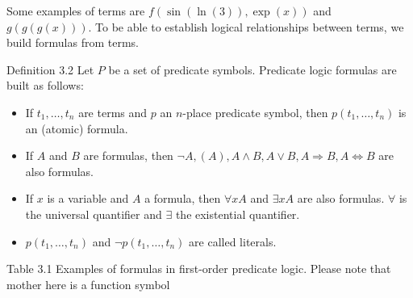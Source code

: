 \documentclass[10pt]{article}
\begin{document}
Some examples of terms are $f(\sin (\ln (3)), \exp (x))$ and $g(g(g(x)))$. To be able to establish logical relationships between terms, we build formulas from terms.

Definition 3.2 Let $P$ be a set of predicate symbols. Predicate logic formulas are built as follows:

\begin{itemize}
  \item If $t_{1}, \ldots, t_{n}$ are terms and $p$ an $n$-place predicate symbol, then $p\left(t_{1}, \ldots, t_{n}\right)$ is an (atomic) formula.
  \item If $A$ and $B$ are formulas, then $\neg A,(A), A \wedge B, A \vee B, A \Rightarrow B, A \Leftrightarrow B$ are also formulas.
  \item If $x$ is a variable and $A$ a formula, then $\forall x A$ and $\exists x A$ are also formulas. $\forall$ is the universal quantifier and $\exists$ the existential quantifier.
  \item $p\left(t_{1}, \ldots, t_{n}\right)$ and $\neg p\left(t_{1}, \ldots, t_{n}\right)$ are called literals.
\end{itemize}

Table 3.1 Examples of formulas in first-order predicate logic. Please note that mother here is a function symbol
\end{document}
